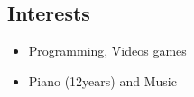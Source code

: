 \documentclass[a4paper, oneside, final]{scrartcl} %
\begin{document}
\begin{center}
\section{Interests}

\begin{itemize}[noitemsep,topsep=0pt,parsep=0pt,partopsep=0pt]
 \setlength{\itemsep}{1pt}
 \item Programming, Videos games
 \item Piano (12years) and Music
\end{itemize}


\end{center}
\end{document}
